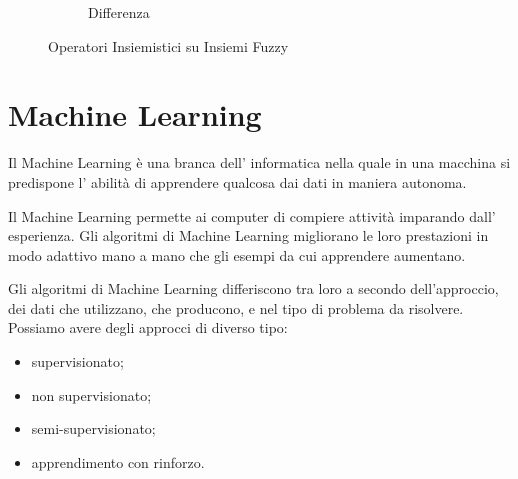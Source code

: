 \documentclass[a4paper,12pt]{report}
\begin{document}
\begin{figure}[h]
\begin{subfigure}[t]{0.5\textwidth}
{
        }
        \caption{Differenza}
    \end{subfigure}
    \caption{Operatori Insiemistici su Insiemi Fuzzy}
\end{figure}




\newpage
\section{Machine Learning}
Il Machine Learning è una branca dell' informatica nella quale in una macchina si predispone l' abilità di apprendere qualcosa dai dati in maniera autonoma.

Il Machine Learning permette ai computer di compiere attività imparando dall' esperienza. \newline
Gli algoritmi di Machine Learning migliorano le loro prestazioni in modo adattivo mano a mano che gli esempi da cui apprendere aumentano.

%
%

\bigskip

Gli algoritmi di Machine Learning differiscono tra loro a secondo dell'approccio, dei dati che utilizzano, che producono, e nel tipo di problema da risolvere.
Possiamo avere degli approcci di diverso tipo:
\begin{itemize}
    \item supervisionato;
    \item non supervisionato;
    \item semi-supervisionato;
    \item apprendimento con rinforzo.
\end{itemize}
\end{document}
